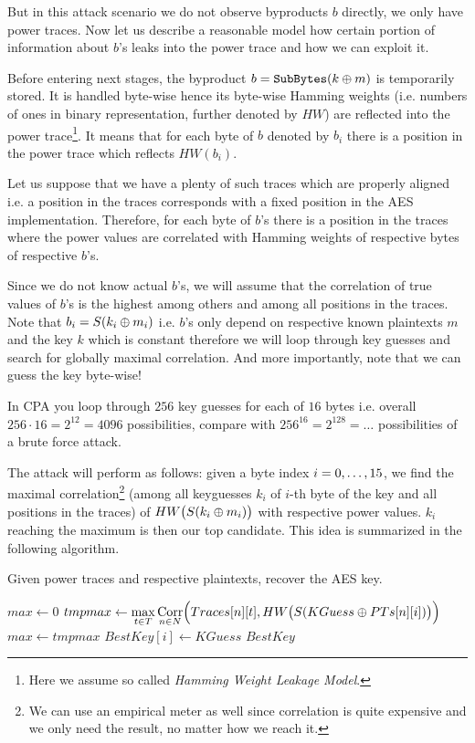 But in this attack scenario we do not observe byproducts $b$ directly, we only have power traces. Now let us describe a reasonable model how certain portion of information about $b$'s leaks into the power trace and how we can exploit it.

Before entering next stages, the byproduct $b = \texttt{SubBytes}(k\oplus m)$ is temporarily stored. It is handled byte-wise hence its byte-wise Hamming weights (i.e. numbers of ones in binary representation, further denoted by $HW$) are reflected into the power trace\footnote{Here we assume so called {\em Hamming Weight Leakage Model}.}. It means that for each byte of $b$ denoted by $b_i$ there is a position in the power trace which reflects $HW(b_i)$.

Let us suppose that we have a plenty of such traces which are properly aligned i.e. a position in the traces corresponds with a fixed position in the AES implementation. Therefore, for each byte of $b$'s there is a position in the traces where the power values are correlated with Hamming weights of respective bytes of respective $b$'s.

Since we do not know actual $b$'s, we will assume that the correlation of true values of $b$'s is the highest among others and among all positions in the traces. Note that $b_i = S(k_i\oplus m_i)$ i.e. $b$'s only depend on respective known plaintexts $m$ and the key $k$ which is constant therefore we will loop through key guesses and search for globally maximal correlation. And more importantly, note that we can guess the key byte-wise!

\begin{note}
\label{note:brutevssca}
	In CPA you loop through $256$ key guesses for each of $16$ bytes i.e. overall $256\cdot 16 = 2^{12} = 4096$ possibilities, compare with $256^{16} = 2^{128} = \ldots$ possibilities of a brute force attack.
\end{note}

The attack will perform as follows: given a byte index $i=0 , \ldots , 15$, we find the maximal correlation\footnote{We can use an empirical meter as well since correlation is quite expensive and we only need the result, no matter how we reach it.} (among all keyguesses $k_i$ of $i$-th byte of the key and all positions in the traces) of $HW\bigl(S(k_i\oplus m_i)\bigr)$ with respective power values. $k_i$ reaching the maximum is then our top candidate. This idea is summarized in the following algorithm.

\begin{alg}
\label{alg:cpa}
Given power traces and respective plaintexts, recover the AES key.
	\begin{algorithmic}[1]
				\State $max \gets 0$
					\State $tmpmax \gets \max\limits_{t\in T} \operatorname*{Corr}\limits_{n\in N}\Bigl(Traces[n][t], HW\bigl(S(KGuess\oplus PTs[n][i])\bigr)\Bigr)$
						\State $max \gets tmpmax$
						\State $BestKey[i] \gets KGuess$
					\EndIf
				\EndFor
			\EndFor
			\State\Return $BestKey$
		\EndFunction
	\end{algorithmic}
\end{alg}

